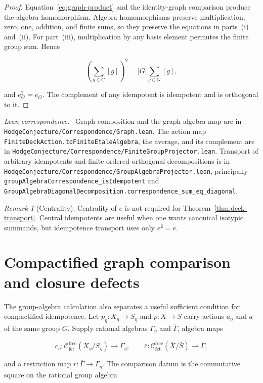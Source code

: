 \documentclass[11pt]{article}
\theoremstyle{definition}
\theoremstyle{remark}
\newtheorem*{remark}{Remark}
\newcommand{\fe}{\mathrm{f\acute et}}
\newcommand{\Geta}{\Gamma_{\eta}}
\newcommand{\Gbar}{\overline{\Gamma}}
\newcommand{\leanpath}[1]{\texttt{\nolinkurl{#1}}}
\newcommand{\corrsrc}[1]{%
  \leanpath{HodgeConjecture/Correspondence/#1}}
\newenvironment{leanfiles}
  {\par\medskip\begingroup\footnotesize\raggedright\noindent
   \textit{Lean correspondence.}\ }
  {\par\endgroup\medskip}
\begin{document}
\begin{proof}
Equation~\eqref{eq:graph-product} and the identity-graph comparison produce
the algebra homomorphism.  Algebra homomorphisms preserve multiplication,
zero, one, addition, and finite sums, so they preserve the equations in
parts~(i) and~(ii).  For part~(iii), multiplication by any basis element
permutes the finite group sum.  Hence

\[
  \left(\sum_{g\in G}[g]\right)^2
  =|G|\sum_{g\in G}[g],
\]

and \(e_G^2=e_G\).  The complement of any idempotent is idempotent and is
orthogonal to it.
\end{proof}

\begin{leanfiles}
Graph composition and the graph algebra map are in \corrsrc{Graph.lean}.
The action map \leanpath{FiniteDeckAction.toFiniteEtaleAlgebra}, the average,
and its complement are in \corrsrc{FiniteGroupProjector.lean}.  Transport of
arbitrary idempotents and finite ordered orthogonal decompositions is in
\corrsrc{GroupAlgebraProjector.lean}, principally
\leanpath{groupAlgebraCorrespondence_isIdempotent} and
\leanpath{GroupAlgebraDiagonalDecomposition.correspondence_sum_eq_diagonal}.
\end{leanfiles}

\begin{remark}[Centrality]
Centrality of \(e\) is not required for Theorem~\ref{thm:deck-transport}.
Central idempotents are useful when one wants canonical isotypic summands,
but idempotence transport uses only \(e^2=e\).
\end{remark}

\section{Compactified graph comparison and closure defects}
\label{sec:compactified-graph}

The group-algebra calculation also separates a useful sufficient condition
for compactified idempotence.  Let
\(p_\eta:X_\eta\to S_\eta\) and
\(\bar p:\bar X\to\bar S\) carry actions \(a_\eta\) and \(\bar a\) of the
same group \(G\).  Supply rational algebras \(\Geta\) and \(\Gbar\),
algebra maps

\[
  c_\eta:\mathcal C_{\fe}^{\mathrm{free}}(X_\eta/S_\eta)
    \longrightarrow \Geta,
  \qquad
  \bar c:\mathcal C_{\fe}^{\mathrm{free}}(\bar X/\bar S)
    \longrightarrow\Gbar,
\]

and a restriction map \(r:\Gbar\to\Geta\).  The comparison datum is the
commutative square on the rational group algebra
\end{document}
